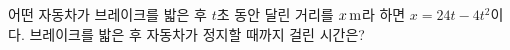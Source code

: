 어떤 자동차가 브레이크를 밟은 후 $t$초 동안 달린 거리를 $x\mkern3mu \mathrm{m}$라 하면 $x=24t-4t^2$이다. 브레이크를 밟은 후 자동차가 정지할 때까지 걸린 시간은?
